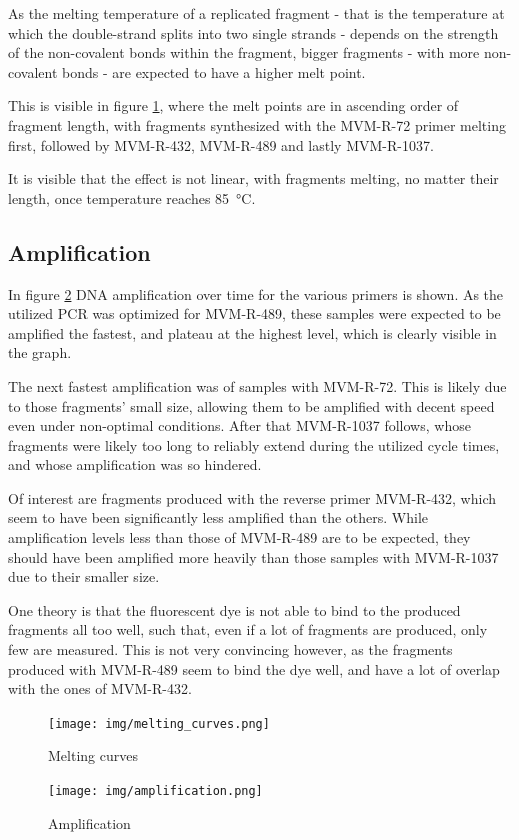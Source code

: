 \documentclass[a4paper,english]{scrreprt}
\begin{document}
As the melting temperature of a replicated fragment - that is the temperature
at which the double-strand splits into two single strands - depends on the
strength of the non-covalent bonds within the fragment, bigger fragments - with
more non-covalent bonds - are expected to have a higher melt point.

This is visible in figure \ref{fig:melting_curves}, where the melt points are
in ascending order of fragment length, with fragments synthesized with the
MVM-R-72 primer melting first, followed by MVM-R-432, MVM-R-489 and lastly
MVM-R-1037.

It is visible that the effect is not linear, with fragments melting, no matter
their length, once temperature reaches \SI{85}{\celsius}.

\subsection{Amplification}

In figure \ref{fig:amplification} DNA amplification over time for the various
primers is shown. As the utilized PCR was optimized for MVM-R-489, these
samples were expected to be amplified the fastest, and plateau at the highest
level, which is clearly visible in the graph.

The next fastest amplification was of samples with MVM-R-72. This is likely due
to those fragments' small size, allowing them to be amplified with decent speed
even under non-optimal conditions. After that MVM-R-1037 follows, whose
fragments were likely too long to reliably extend during the utilized cycle
times, and whose amplification was so hindered.

Of interest are fragments produced with the reverse primer MVM-R-432, which
seem to have been significantly less amplified than the others. While
amplification levels less than those of MVM-R-489 are to be expected, they
should have been amplified more heavily than those samples with MVM-R-1037 due
to their smaller size.

One theory is that the fluorescent dye is not able to bind to the produced
fragments all too well, such that, even if a lot of fragments are produced,
only few are measured. This is not very convincing however, as the fragments
produced with MVM-R-489 seem to bind the dye well, and have a lot of overlap
with the ones of MVM-R-432.

\begin{figure}
	\centering
	\texttt{[image: img/melting\_curves.png]}
	\caption{Melting curves}
	\label{fig:melting_curves}
\end{figure}

\begin{figure}
	\centering
	\texttt{[image: img/amplification.png]}
	\caption{Amplification}
	\label{fig:amplification}
\end{figure}




\end{document}
